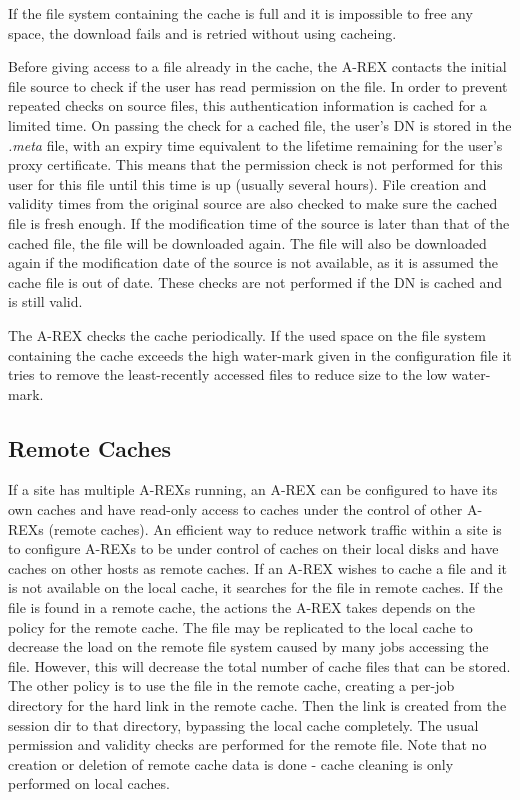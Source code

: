 \documentclass{article}                            %
\begin{document}
If the file system containing the cache is full and it is impossible
to free any space, the download fails and is retried without using
cacheing.

Before giving access to a file already in the cache, the A-REX
contacts the initial file source to check if the user has read
permission on the file. In order to prevent repeated checks on source
files, this authentication information is cached for a limited
time. On passing the check for a cached file, the user's DN is stored
in the \emph{.meta} file, with an expiry time equivalent to the
lifetime remaining for the user's proxy certificate. This means that
the permission check is not performed for this user for this file
until this time is up (usually several hours). File creation and
validity times from the original source are also checked to make sure
the cached file is fresh enough. If the modification time of the
source is later than that of the cached file, the file will be
downloaded again. The file will also be downloaded again if the
modification date of the source is not available, as it is assumed the
cache file is out of date. These checks are not performed if the DN is
cached and is still valid.

The A-REX checks the cache periodically. If the used space on the file
system containing the cache exceeds the high water-mark given in the
configuration file it tries to remove the least-recently accessed
files to reduce size to the low water-mark.

\subsection{Remote Caches}
\label{sec:remotecaches}

If a site has multiple A-REXs running, an A-REX can be configured to
have its own caches and have read-only access to caches under the
control of other A-REXs (remote caches). An efficient way to reduce
network traffic within a site is to configure A-REXs to be under
control of caches on their local disks and have caches on other hosts
as remote caches. If an A-REX wishes to cache a file and it is not
available on the local cache, it searches for the file in remote
caches. If the file is found in a remote cache, the actions the A-REX
takes depends on the policy for the remote cache. The file may be
replicated to the local cache to decrease the load on the remote file
system caused by many jobs accessing the file. However, this will
decrease the total number of cache files that can be stored. The other
policy is to use the file in the remote cache, creating a per-job
directory for the hard link in the remote cache. Then the link is
created from the session dir to that directory, bypassing the local
cache completely. The usual permission and validity checks are
performed for the remote file. Note that no creation or deletion of
remote cache data is done - cache cleaning is only performed on local
caches.
\end{document}
